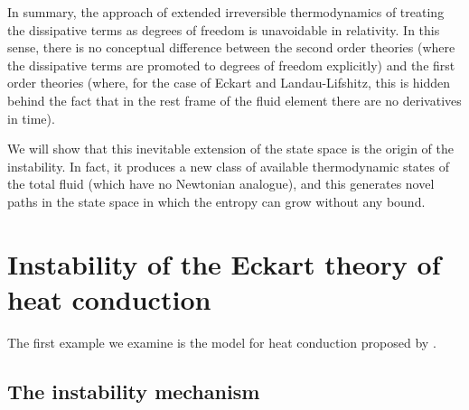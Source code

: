 \documentclass[a4paper, amsfonts, amssymb, amsmath, reprint, showkeys, nofootinbib, twoside]{revtex4-1}
\begin{document}
In summary, the approach of extended irreversible thermodynamics \citep{Stewart_1977,Jou_Extended} of treating the dissipative terms as degrees of freedom is unavoidable in relativity. In this sense, there is no conceptual difference between the second order theories (where the dissipative terms are promoted to degrees of freedom explicitly) and the first order theories (where, for the case of Eckart and Landau-Lifshitz, this is hidden behind the fact that in the rest frame of the fluid element there are no derivatives in time). 

We will show that this inevitable extension of the state space is the origin of the instability. 
In fact, it produces a new class of available thermodynamic states of the total fluid (which have no Newtonian analogue), and this generates novel paths in the state space in which the entropy can grow without any bound.


\section{Instability of the Eckart theory of heat conduction}\label{EcKo}

The first example we examine is the model for heat conduction proposed by \citet{Eckart1940}. 

\subsection{The instability mechanism}\label{the_prrof}
\end{document}
